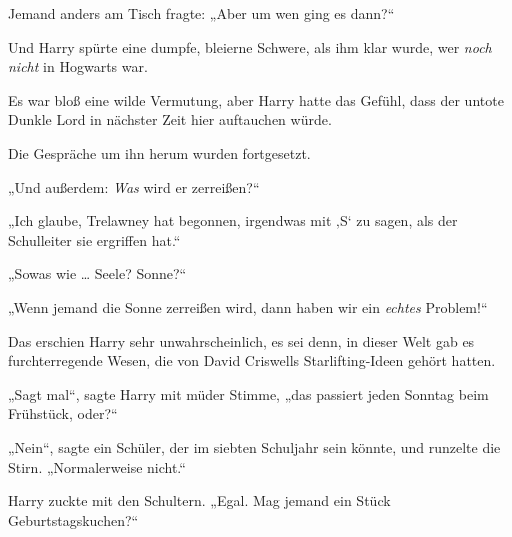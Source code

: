 Jemand anders am Tisch fragte:
„Aber um wen ging es dann?“

Und Harry spürte eine dumpfe, bleierne Schwere, als ihm klar wurde, wer \emph{noch nicht} in Hogwarts war.

Es war bloß eine wilde Vermutung, aber Harry hatte das Gefühl, dass der untote Dunkle Lord in nächster Zeit hier auftauchen würde.

Die Gespräche um ihn herum wurden fortgesetzt.

„Und außerdem: \emph{Was} wird er zerreißen?“

„Ich glaube, Trelawney hat begonnen, irgendwas mit ‚S‘ zu sagen, als der Schulleiter sie ergriffen hat.“

„Sowas wie … Seele? Sonne?“

„Wenn jemand die Sonne zerreißen wird, dann haben wir ein \emph{echtes} Problem!“

Das erschien Harry sehr unwahrscheinlich, es sei denn, in dieser Welt gab es furchterregende Wesen, die von David Criswells Starlifting-Ideen gehört hatten.%

„Sagt mal“, sagte Harry mit müder Stimme, „das passiert jeden Sonntag beim Frühstück, oder?“

„Nein“, sagte ein Schüler, der im siebten Schuljahr sein könnte, und runzelte die Stirn.
„Normalerweise nicht.“

Harry zuckte mit den Schultern.
„Egal. Mag jemand ein Stück Geburtstagskuchen?“

